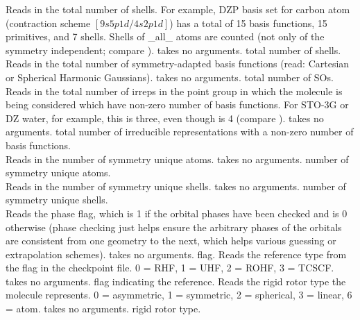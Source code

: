 {Reads in the total number of shells. For example, DZP basis set for 
carbon atom (contraction scheme $[9s5p1d/4s2p1d]$) has a total of 15 basis 
functions, 15 primitives, and 7 shells. Shells of \_all\_ atoms are counted
(not only of the symmetry independent; compare ).}
{takes no arguments.}
{total number of shells.} \\
{Reads in the total number of symmetry-adapted basis functions (read:
Cartesian or Spherical Harmonic Gaussians).}
{takes no arguments.}
{total number of SOs.} \\
{Reads in the total number of irreps
in the point group in which the molecule is being considered which
have non-zero number of basis functions. For STO-3G or DZ water, for
example, this is three, even though  is 4 (compare
).}
{takes no arguments.}
{total number of irreducible representations
with a non-zero number of basis functions.} \\
{Reads in the number of symmetry unique atoms.}
{takes no arguments.}
{number of symmetry unique atoms.} \\
{Reads in the number of symmetry unique shells.}
{takes no arguments.}
{number of symmetry unique shells.} \\
{Reads the phase flag, which is 1 if the orbital phases have been checked
and is 0 otherwise (phase checking just helps ensure the arbitrary phases
of the orbitals are consistent from one geometry to the next, which helps
various guessing or extrapolation schemes).}
{takes no arguments.}
{flag.}
{Reads the reference type from the flag in the checkpoint file.
0 = RHF, 1 = UHF, 2 = ROHF, 3 = TCSCF.}
{takes no arguments.}
{flag indicating the reference.}
{Reads the rigid rotor type the molecule represents.
0 = asymmetric, 1 = symmetric, 2 = spherical, 3 = linear, 6 = atom.}
{takes no arguments.}
{rigid rotor type.}


